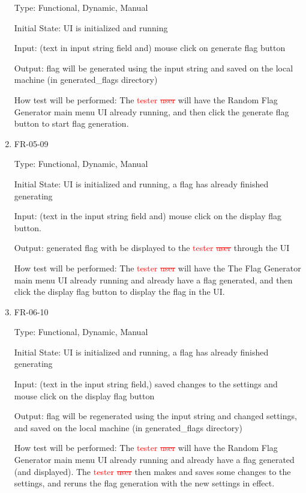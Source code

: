 \documentclass[12pt, titlepage]{article}
\begin{document}
\begin{enumerate}
Type: Functional, Dynamic, Manual

Initial State: UI is initialized and running

Input: (text in input string field and) mouse click on generate flag button

Output: flag will be generated using the input string and saved on the local
machine (in \/generated\_flags directory)

How test will be performed: The \textcolor{red}{tester \sout{user}} will have
the Random Flag Generator main menu UI already running, and then click the
generate flag button to start flag generation.

\item{FR-05-09\\}

Type: Functional, Dynamic, Manual

Initial State: UI is initialized and running, a flag has already finished
generating

Input: (text in the input string field and) mouse click on the display flag
button.

Output: generated flag with be displayed to the \textcolor{red}{tester
\sout{user}} through the UI

How test will be performed: The \textcolor{red}{tester \sout{user}} will have
the The Flag Generator main menu UI already running and already have a flag
generated, and then click the display flag button to display the flag in the
UI.

\item{FR-06-10\\}

Type: Functional, Dynamic, Manual

Initial State: UI is initialized and running, a flag has already finished
generating

Input: (text in the input string field,) saved changes to the settings and
mouse click on the display flag button

Output: flag will be regenerated using the input string and changed settings,
and saved on the local machine (in \/generated\_flags directory)

How test will be performed: The \textcolor{red}{tester \sout{user}} will have
the Random Flag Generator main menu UI already running and already have a flag
generated (and displayed). The \textcolor{red}{tester \sout{user}} then makes
and saves some changes to the settings, and reruns the flag generation with the
new settings in effect.


\end{enumerate}
\end{document}
